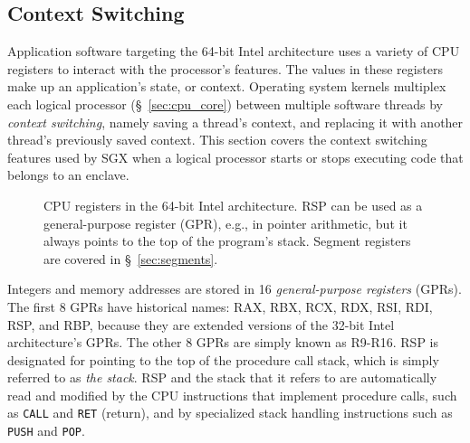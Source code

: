 \subsection{Context Switching}
\label{sec:registers}

Application software targeting the 64-bit Intel architecture uses a variety of
CPU registers to interact with the processor's features. The values in these
registers make up an application's state, or context. Operating system kernels
multiplex each logical processor (\S~\ref{sec:cpu_core}) between multiple
software threads by \textit{context switching}, namely saving a thread's
context, and replacing it with another thread's previously saved context. This
section covers the context switching features used by SGX when a logical
processor starts or stops executing code that belongs to an enclave.


\begin{figure}[hbt]
  \caption{
    CPU registers in the 64-bit Intel architecture. RSP can be used as a
    general-purpose register (GPR), e.g., in pointer arithmetic, but it always
    points to the top of the program's stack. Segment registers are covered in
    \S~\ref{sec:segments}.
  }
  \label{fig:cpu_registers}
\end{figure}

Integers and memory addresses are stored in 16 \textit{general-purpose
registers} (GPRs). The first 8 GPRs have historical names: RAX, RBX, RCX,
RDX, RSI, RDI, RSP, and RBP, because they are extended versions of the 32-bit
Intel architecture's GPRs. The other 8 GPRs are simply known as R9-R16. RSP is
designated for pointing to the top of the procedure call stack, which is simply
referred to as \textit{the stack}. RSP and the stack that it refers to are
automatically read and modified by the CPU instructions that implement
procedure calls, such as \texttt{CALL} and \texttt{RET} (return), and by
specialized stack handling instructions such as \texttt{PUSH} and \texttt{POP}.

